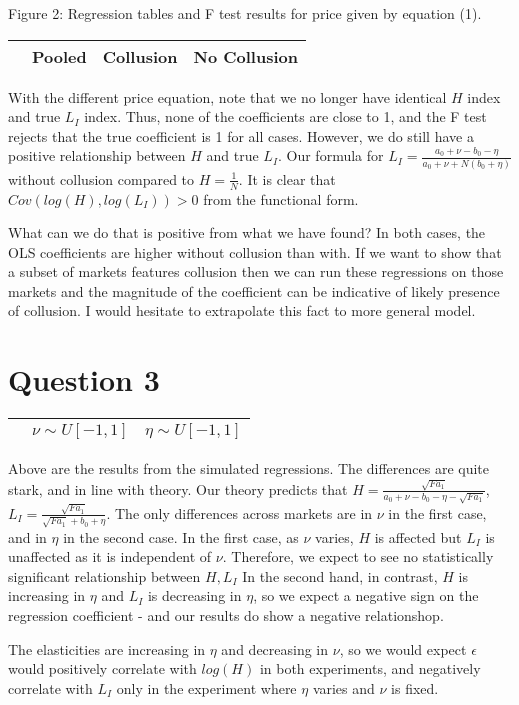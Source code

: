 \documentclass[11pt]{article} %
\begin{document}
\bigskip

\begin{center}
Figure 2: Regression tables and F test results for price given by equation (1).
\begin{tabular}{l | lll}
\hline
 & Pooled & Collusion & No Collusion \\
\hline \hline

\hline

\hline
\end{tabular}
\end{center}

\bigskip

With the different price equation, note that we no longer have identical $H$ index and true $L_I$ index. Thus, none of the coefficients are close to 1, and the F test rejects that the true coefficient is 1 for all cases. However, we do still have a positive relationship between $H$ and true $L_I$. Our formula for $L_I = \frac{a_0 + \nu - b_0 - \eta}{a_0 + \nu + N(b_0 + \eta)}$ without collusion compared to $H = \frac{1}{N}$. It is clear that $Cov(log(H),log(L_I))>0$ from the functional form.

What can we do that is positive from what we have found? In both cases, the OLS coefficients are higher without collusion than with. If we want to show that a subset of markets features collusion then we can run these regressions on those markets and the magnitude of the coefficient can be indicative of likely presence of collusion. I would hesitate to extrapolate this fact to more general model.

\section{Question 3}

\begin{center}
\begin{tabular}{l | ll}
\hline
 & $\nu \sim U[-1,1]$ &  $\eta \sim U[-1,1]$ \\
\hline \hline

\hline
\end{tabular}
\end{center}

Above are the results from the simulated regressions. The differences are quite stark, and in line with theory. Our theory predicts that $H =  \frac{\sqrt{F a_1}}{a_0 + \nu - b_0 - \eta - \sqrt{F a_1}}$, $L_I = \frac{\sqrt{Fa_1}}{\sqrt{Fa_1}+b_0 + \eta}$. The only differences across markets are in $\nu$ in the first case, and in $\eta$ in the second case. In the first case, as $\nu$ varies, $H$ is affected but $L_I$ is unaffected as it is independent of $\nu$. Therefore, we expect to see no statistically significant relationship between $H,L_I$ In the second hand, in contrast, $H$ is increasing in $\eta$ and $L_I$ is decreasing in $\eta$, so we expect a negative sign on the regression coefficient - and our results do show a negative relationshop.

The elasticities are increasing in $\eta$ and decreasing in $\nu$, so we would expect $\epsilon$ would positively correlate with $log(H)$ in both experiments, and negatively correlate with $L_I$ only in the experiment where $\eta$ varies and $\nu$ is fixed.
\end{document}

